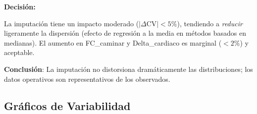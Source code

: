\documentclass[12pt,letterpaper,twoside]{report}
\begin{document}
\begin{table}[H]
\centering
\caption{Coeficiente de Variación: Observado vs Operativo (promedio 10 usuarios)}
\label{tab:variability_dual}
\end{table}

\begin{decisionbox}
\textbf{Decisión:}

La imputación tiene un impacto moderado ($|\Delta\text{CV}| < 5\%$), tendiendo a \textit{reducir} ligeramente la dispersión (efecto de regresión a la media en métodos basados en medianas). El aumento en FC\_caminar y Delta\_cardiaco es marginal ($<2\%$) y aceptable.

\textbf{Conclusión}: La imputación no distorsiona dramáticamente las distribuciones; los datos operativos son representativos de los observados.
\end{decisionbox}

\subsection{Gráficos de Variabilidad}
\end{document}
